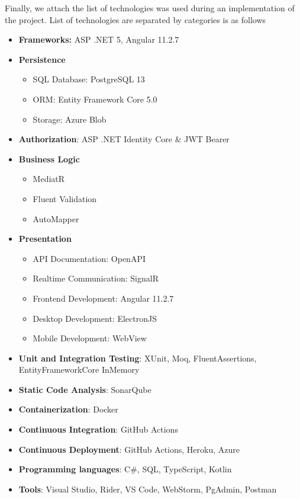 Finally, we attach the list of technologies was used during an implementation of the project.
List of technologies are separated by categories is as follows
\begin{itemize}
    \item \textbf{Frameworks:} ASP .NET 5, Angular 11.2.7
    \item \textbf{Persistence}
    \begin{itemize}
        \item SQL Database: PostgreSQL 13
        \item ORM: Entity Framework Core 5.0
        \item Storage: Azure Blob
    \end{itemize}
    \item \textbf{Authorization}: ASP .NET Identity Core \& JWT Bearer
    \item \textbf{Business Logic}
    \begin{itemize}
        \item MediatR
        \item Fluent Validation
        \item AutoMapper
    \end{itemize}
    \item \textbf{Presentation}
    \begin{itemize}
        \item API Documentation: OpenAPI
        \item Realtime Communication: SignalR
        \item Frontend Development: Angular 11.2.7
        \item Desktop Development: ElectronJS
        \item Mobile Development: WebView
    \end{itemize}
    \item \textbf{Unit and Integration Testing}: XUnit, Moq, FluentAssertions, EntityFrameworkCore InMemory
    \item \textbf{Static Code Analysis}: SonarQube
    \item \textbf{Containerization}: Docker
    \item \textbf{Continuous Integration}: GitHub Actions
    \item \textbf{Continuous Deployment}: GitHub Actions, Heroku, Azure
    \item \textbf{Programming languages}: C\#, SQL, TypeScript, Kotlin
    \item \textbf{Tools}: Visual Studio, Rider, VS Code, WebStorm, PgAdmin, Postman
\end{itemize}